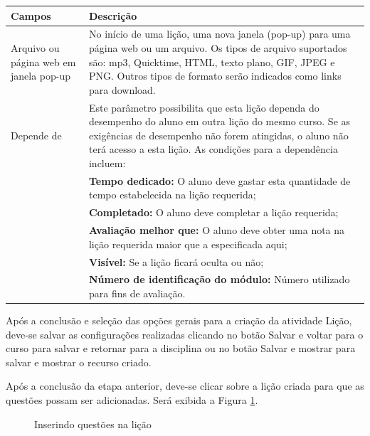 \begin{longtable}{p{4cm}|p{11cm}}
   \hline
 \rowcolor[rgb]{0.8,0.8,0.8} \textbf{Campos} &  \textbf{Descrição}\\\hline
  {Arquivo ou página web em janela pop-up} & No início de uma lição, uma nova janela (pop-up) para uma página web ou um arquivo. Os tipos de arquivo suportados são: mp3, Quicktime, HTML, texto plano, GIF, JPEG e PNG. Outros tipos de formato serão indicados como links para download.\\\hline
  {Depende de} & Este parâmetro possibilita que esta lição dependa do desempenho do aluno em outra lição do mesmo curso. Se as exigências de desempenho não forem atingidas, o aluno não terá acesso a esta lição. As condições para a dependência incluem:\\
  & \textbf{Tempo dedicado:}  O aluno deve gastar esta quantidade de tempo estabelecida na lição requerida;\\
  &\textbf{Completado:}  O aluno deve completar a lição requerida;\\
  &\textbf{Avaliação melhor que:} O aluno deve obter uma nota na lição requerida maior que a especificada aqui;\\
  &\textbf{Visível:}  Se a lição ficará oculta ou não;\\
  &\textbf{Número de identificação do módulo:} Número utilizado para fins de avaliação.\\\hline
\end{longtable}

Após a conclusão e seleção das opções gerais para a criação da atividade Lição, deve-se salvar as configurações realizadas clicando no botão Salvar e voltar para o curso para salvar e retornar para a disciplina ou no botão Salvar e mostrar para salvar e mostrar o recurso criado.

Após a conclusão da etapa anterior, deve-se clicar sobre a lição criada para que as questões possam ser adicionadas. Será exibida a Figura \ref{fig:inserindo_quest}.

\begin{figure}
 \begin{center}
  \caption{Inserindo questões na lição}
  \label{fig:inserindo_quest}
 \end{center}
\end{figure}

